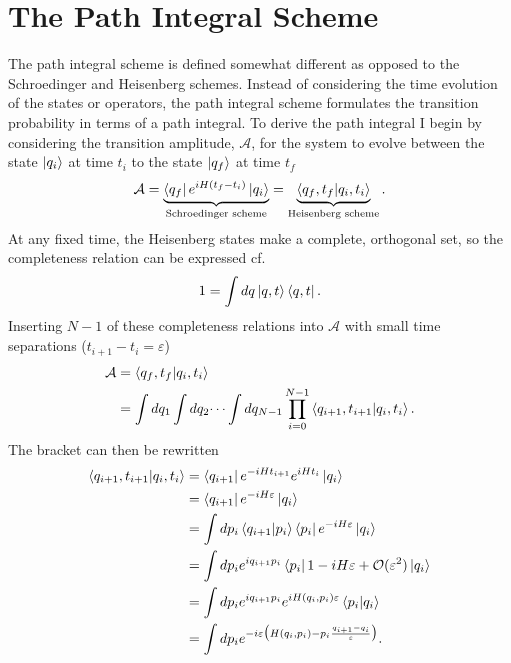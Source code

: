 \section{The Path Integral Scheme}
\label{sec:path scheme}
The path integral scheme is defined somewhat different as opposed to the Schroedinger and Heisenberg schemes. Instead of considering the time evolution of the states or operators, the path integral scheme formulates the transition probability in terms of a path integral. To derive the path integral I begin by considering the transition amplitude, $\mathcal{A}$, for the system to evolve between the state $\ket{q_i}$ at time $t_i$ to the state $\ket{q_f}$ at time $t_f$
\begin{equation}
	\mathcal{A}=\underbrace{\bra{q_f}e^{iH(t_f-t_i)}\ket{q_i}}_{\text{Schroedinger scheme}}=\underbrace{\braket{q_f,t_f|q_i,t_i}}_{\text{Heisenberg scheme}}.
\end{equation} 
At any fixed time, the Heisenberg states make a complete, orthogonal set, so the completeness relation can be expressed cf.
\begin{equation}
	1=\int dq \ket{q,t}\bra{q,t}.
\end{equation} 
Inserting $N-1$ of these completeness relations into $\mathcal{A}$ with small time separations ($t_{i+1}-t_i=\varepsilon$)
\begin{equation}
	\begin{split}
		\mathcal{A}&=\braket{q_f,t_f|q_i,t_i}\\
		&=\int dq_1\int dq_2 \dots \int dq_{N-1}\prod_{i=0}^{N-1}\braket{q_{i+1},t_{i+1}|q_i,t_i}.
	\end{split}
\end{equation} 
The bracket can then be rewritten
\begin{equation}
	\begin{split}
		\braket{q_{i+1},t_{i+1}|q_i,t_i}&=\bra{q_{i+1}}e^{-iHt_{i+1}}e^{iHt_{i}}\ket{q_i}\\
		&=\bra{q_{i+1}}e^{-iH\varepsilon}\ket{q_i}\\
		&=\int dp_i\braket{q_{i+1}|p_i}\bra{p_i}e^{-iH\varepsilon}\ket{q_i}\\
		&=\int dp_ie^{iq_{i+1}p_i}\bra{p_i}1-iH\varepsilon+\mathcal{O}(\varepsilon^2)\ket{q_i}\\
		&=\int dp_ie^{iq_{i+1}p_i}e^{iH(q_i,p_i)\varepsilon}\braket{p_i|q_i}\\
		&=\int dp_ie^{-i\varepsilon\big(H(q_i,p_i)-p_i\frac{q_{i+1}-q_i}{\varepsilon}\big)}.\\
	\end{split}
\end{equation} 
